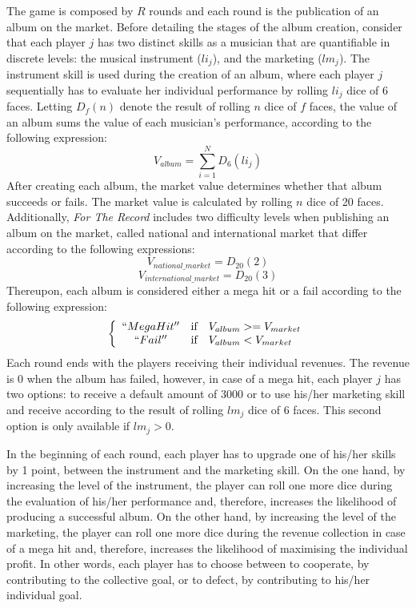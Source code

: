 The game is composed by $R$ rounds and each round is the publication of an album on the market. Before detailing the stages of the album creation, consider that each player $j$ has two distinct skills as a musician that are quantifiable in discrete levels: the musical instrument ($li_j$), and the marketing ($lm_j$). 
The instrument skill is used during the creation of an album, where each player $j$ sequentially has to evaluate her individual performance by rolling $li_j$ dice of 6 faces. Letting $D_f(n)$ denote the result of rolling $n$ dice of $f$ faces, the value of an album sums the value of each musician's performance, according to the following expression:
\[ V_{album}=\sum_{i=1}^{N} D_6(li_j) \]
After creating each album, the market value determines whether that album succeeds or fails. The market value is calculated by rolling $n$ dice of 20 faces. Additionally, \textit{For The Record} includes two difficulty levels when publishing an album on the market, called national and international market that differ according to the following expressions:
\[V_{national\_market} = D_{20}(2)\]
\[V_{international\_market} = D_{20}(3)\]
Thereupon, each album is considered either a mega hit or a fail according to the following expression:
\[ \left\{ \begin{array}{ccl}
``Mega Hit'' & \mbox{if} & V_{album} >= V_{market}\\
``Fail'' & \mbox{if} & V_{album} < V_{market}
\end{array}\right.\]
Each round ends with the players receiving their individual revenues. The revenue is $0$ when the album has failed, however, in case of a mega hit, each player $j$ has two options: to receive a default amount of $3000$ or to use his/her marketing skill and receive according to the result of rolling $lm_j$ dice of 6 faces. This second option is only available if $lm_j > 0$.




In the beginning of each round, each player has to upgrade one of his/her skills by 1 point, between the instrument and the marketing skill. %
On the one hand, by increasing the level of the instrument, the player can roll one more dice during the evaluation of his/her performance and, therefore, increases the likelihood of producing a successful album. On the other hand, by increasing the level of the marketing, the player can roll one more dice during the revenue collection in case of a mega hit and, therefore, increases the likelihood of maximising the individual profit. In other words, each player has to choose between to cooperate, by contributing to the collective goal, or to defect, by contributing to his/her individual goal.

